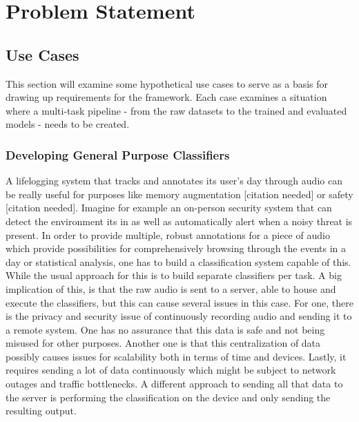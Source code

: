 \chapter{Problem Statement} \label{problem}

\section{Use Cases}

This section will examine some hypothetical use cases to serve as a basis for drawing up requirements for the framework. Each case examines a situation where a multi-task pipeline - from the raw datasets to the trained and evaluated models - needs to be created. 


\subsection{Developing General Purpose Classifiers}

A lifelogging system that tracks and annotates its user's day through audio can be really useful for purposes like memory augmentation [citation needed] or safety [citation needed]. Imagine for example an on-person security system that can detect the environment its in as well as automatically alert when a noisy threat is present. In order to provide multiple, robust annotations for a piece of audio which provide possibilities for comprehensively browsing through the events in a day or statistical analysis, one has to build a classification system capable of this. While the usual approach for this is to build separate classifiers per task. A big implication of this, is that the raw audio is sent to a server, able to house and execute the classifiers, but this can cause several issues in this case. For one, there is the privacy and security issue of continuously recording audio and sending it to a remote system. One has no assurance that this data is safe and not being misused for other purposes. Another one is that this centralization of data possibly causes issues for scalability both in terms of time and devices. Lastly, it requires sending a lot of data continuously which might be subject to network outages and traffic bottlenecks. A different approach to sending all that data to the server is performing the classification on the device and only sending the resulting output.\\

